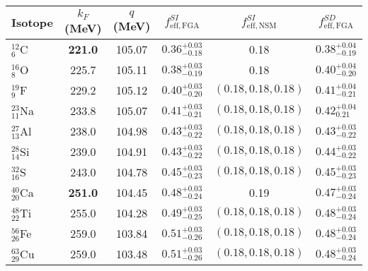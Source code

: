 \documentclass[12pt,letterpaper]{book}
\begin{document}
\begin{table}
\centering
{\renewcommand{\arraystretch}{1.5}
\begin{tabular}{lccccc}
\hline
\hline
Isotope & $k_F$ (MeV) & $q$ (MeV) & $f_\mathrm{eff,FGA}^{SI}$ & $f_\mathrm{eff,NSM}^{SI}$ & $f_\mathrm{eff,FGA}^{SD}$\\
\hline
$^{12}_6$C & \textbf{221.0} & 105.07 & $0.36^{+0.03}_{-0.18}$ & 0.18 & $0.38^{+0.04}_{-0.19}$\\
$^{16}_8$O & 225.7 & 105.11 & $0.38^{+0.03}_{-0.19}$ & 0.18 & $0.40^{+0.04}_{-0.20}$\\
$^{19}_9$F & 229.2 & 105.12 & $0.40^{+0.03}_{-0.20}$ & $(0.18,0.18,0.18)$ & $0.41^{+0.04}_{-0.21}$\\
$^{23}_{11}$Na & 233.8 & 105.07 & $0.41^{+0.03}_{-0.21}$ & $(0.18,0.18,0.18)$ & $0.42^{+0.04}_{0.21}$ \\
$^{27}_{13}$Al & 238.0 & 104.98 & $0.43^{+0.03}_{-0.22}$ & $(0.18, 0.18, 0.18)$ & $0.43^{+0.03}_{-0.22}$\\
$^{28}_{14}$Si & 239.0 & 104.91 & $0.43^{+0.03}_{-0.22}$ & $(0.18, 0.18, 0.18)$ & $0.44^{+0.03}_{-0.22}$ \\
$^{32}_{16}$S & 243.0 & 104.78 & $0.45^{+0.03}_{-0.23}$ & $(0.18,0.18,0.18)$ & $0.45^{+0.03}_{-0.23}$ \\
$^{40}_{20}$Ca & \textbf{251.0} & 104.45 & $0.48^{+0.03}_{-0.24}$ & 0.19 & $0.47^{+0.03}_{-0.24}$\\
$^{48}_{22}$Ti & 255.0 & 104.28 & $0.49^{+0.03}_{-0.25}$ & $(0.18,0.18,0.18)$ & $0.48^{+0.03}_{-0.24}$\\
$^{56}_{26}$Fe & 259.0 & 103.84 & $0.51^{+0.03}_{-0.26}$ & $(0.18,0.18,0.18)$ & $0.48^{+0.03}_{-0.24}$ \\
$^{63}_{29}$Cu & 259.0 & 103.48 & $0.51^{+0.03}_{-0.26}$ & $(0.18, 0.18, 0.18)$ & $0.48^{+0.03}_{-0.24}$\\
\hline\hline
\end{tabular}
}

\end{table}
\end{document}
